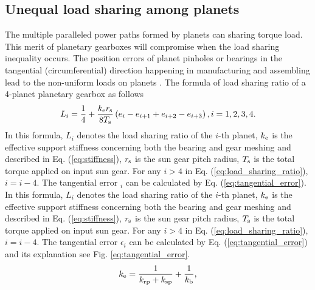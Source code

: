 \documentclass[a4paper,fleqn]{cas-sc}%
\begin{document}
\subsection{Unequal load sharing among planets}
\par The multiple paralleled power paths formed by planets can sharing torque load. This merit of planetary gearboxes will compromise when the load sharing inequality occurs. The position errors of planet pinholes or bearings in the tangential (circumferential) direction happening in manufacturing and assembling lead to the non-uniform loads on planets \cite{Singh2010511-530}. The formula of load sharing ratio of a 4-planet planetary gearbox as follows \cite{Ligata2009}
\begin{equation}
    L_i=\frac{1}{4}+\frac{k_{\rm e} r_{\rm s}}{8 T_{\rm s}}\left(e_i-e_{i+1}+e_{i+2}-e_{i+3}\right), i=1,2,3,4. \label{eq:load_sharing_ratio}
\end{equation}
In this formula, \(L_i\) denotes the load sharing ratio of the \(i\)-th planet, \(k_{\rm e}\) is the effective support stiffness concerning both the bearing and gear meshing and described in Eq. (\ref{eq:stiffness}), \(r_{\rm s}\) is the sun gear pitch radius, \(T_{\rm s}\) is the total torque applied on input sun gear. For any \(i>4\) in Eq. (\ref{eq:load_sharing_ratio}), \(i=i-4\). The tangential error $_{i}$ can be calculated by Eq. (\ref{eq:tangential_error}).
In this formula, \(L_i\) denotes the load sharing ratio of the \(i\)-th planet, \(k_{\rm e}\) is the effective support stiffness concerning both the bearing and gear meshing and described in Eq. (\ref{eq:stiffness}), \(r_{\rm s}\) is the sun gear pitch radius, \(T_{\rm s}\) is the total torque applied on input sun gear. For any \(i>4\) in Eq. (\ref{eq:load_sharing_ratio}), \(i=i-4\). The tangential error $\epsilon_{i}$ can be calculated by Eq. (\ref{eq:tangential_error}) and its explanation see Fig. \ref{eq:tangential_error}.
\begin{equation}
    k_{\rm e}=\frac{1}{k_{\rm rp}+k_{\rm sp}}+\frac{1}{k_{\rm b}},\label{eq:stiffness}
\end{equation}
\end{document}
